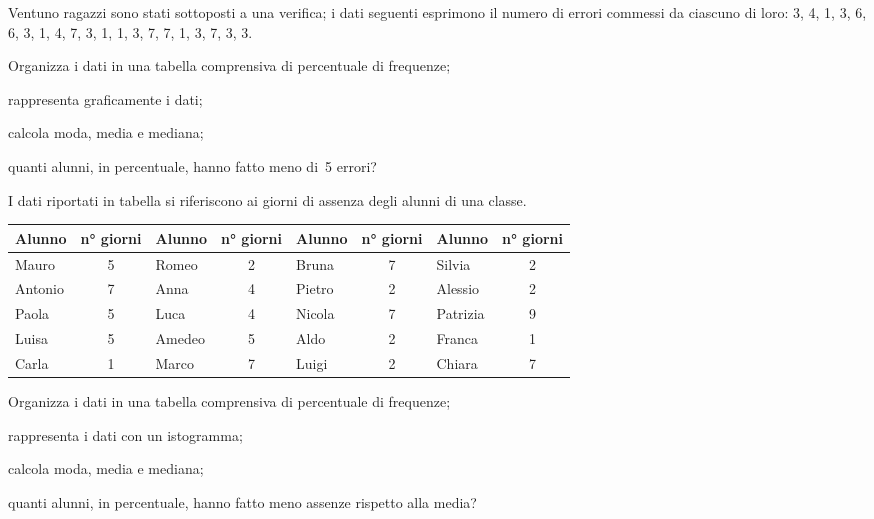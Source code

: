 \begin{esercizio}
\label{ese:A.43}
Ventuno ragazzi sono stati sottoposti a una verifica; i dati seguenti 
esprimono il numero di errori commessi da ciascuno
di loro: 3, 4, 1, 3, 6, 6, 3, 1, 4, 7, 3, 1, 1, 3, 7, 7, 1, 3, 7, 3, 3.
\begin{enumeratea}
 \item Organizza i dati in una tabella comprensiva di percentuale di 
frequenze;
 \item rappresenta graficamente i dati;
 \item calcola moda, media e mediana;
 \item quanti alunni, in percentuale, hanno fatto meno di~5 errori?
\end{enumeratea}
\end{esercizio}

\begin{esercizio}
\label{ese:A.44}
I dati riportati in tabella si riferiscono ai giorni di assenza degli 
alunni di una classe.
\begin{center}
 \begin{tabular}{*{4}{lc}}
\toprule
Alunno & n° giorni & Alunno & n° giorni & Alunno & n° giorni & Alunno & n° 
giorni\\
\midrule
Mauro & 5 & Romeo & 2 & Bruna & 7 & Silvia & 2\\
Antonio & 7 & Anna & 4 & Pietro & 2 & Alessio & 2\\
Paola & 5 & Luca & 4 & Nicola & 7 & Patrizia & 9\\
Luisa & 5 & Amedeo & 5 & Aldo & 2 & Franca & 1\\
Carla & 1 & Marco & 7 & Luigi & 2 & Chiara & 7\\
\bottomrule
\end{tabular}
\end{center}
\begin{enumeratea}
 \item Organizza i dati in una tabella comprensiva di percentuale di 
frequenze;
 \item rappresenta i dati con un istogramma;
 \item calcola moda, media e mediana;
 \item quanti alunni, in percentuale, hanno fatto meno assenze rispetto 
alla media?
\end{enumeratea}
\end{esercizio}

